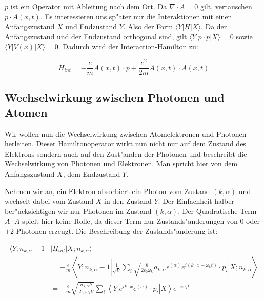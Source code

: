 $p$ ist ein Operator mit Ableitung nach dem Ort. Da $\nabla \cdot A = 0$ gilt, vertauschen $p \cdot A(x, t)$. Es interessieren uns sp"ater nur die Interaktionen mit einen Anfangszustand $X$ und Endzustand $Y$. Also der Form $\langle Y|H|X \rangle$. Da der Anfangszustand und der Endzustand orthogonal sind, gilt $\langle Y|p \cdot p|X \rangle = 0$ sowie $\langle Y|V(x)|X \rangle = 0$. Dadurch wird der Interaction-Hamilton zu:

\begin{equation*}
H_{int} = -\frac{e}{m} A(x, t) \cdot p + \frac{e^2}{2m}A(x, t) \cdot A(x, t)
\end{equation*}

\subsection{Wechselwirkung zwischen Photonen und Atomen}

Wir wollen nun die Wechselwirkung zwischen Atomelektronen und Photonen herleiten. Dieser Hamiltonoperator wirkt nun nicht nur auf dem Zustand des Elektrons sondern auch auf den Zust"anden der Photonen und beschreibt die Wechselwirkung von Photonen und Elektronen. Man spricht hier von dem Anfangszustand $X$, dem Endzustand $Y$.

Nehmen wir an, ein Elektron absorbiert ein Photon vom Zustand $(k,\alpha)$ und wechselt dabei vom Zustand $X$ in den Zustand $Y$. Der Einfachheit halber ber"ucksichtigen wir nur Photonen im Zustand $(k,\alpha)$. Der Quadratische Term $A \cdot A$ spielt hier keine Rolle, da dieser Term nur Zustands"anderungen von $0$ oder $\pm 2$ Photonen erzeugt. Die Beschreibung der Zustands"anderung ist:

\begin{equation} \label{fq:absorbtion}
\begin{split}
\langle Y; n_{k,\alpha} - 1 &| H_{int} | X; n_{k,\alpha} \rangle \\
&= -\frac{e}{m} \left\langle Y; n_{k,\alpha} - 1 \left| 
\frac{1}{\sqrt{V}} \sum_i \sqrt{\frac{\hbar}{2 \epsilon_0 \omega_k}}a_{k,\alpha} \epsilon^{(\alpha)} e^{i(k \cdot x-\omega_k t)} \cdot p_i 
\right| X; n_{k,\alpha} \right\rangle\\
&= -\frac{e}{m} \sqrt{\frac{n_{k,\alpha} \hbar}{2 \epsilon_0 \omega_k V}} \sum_i \left\langle Y \left| 
e^{ik \cdot x} \epsilon^{(\alpha)} \cdot p_i 
\right| X \right\rangle e^{-i\omega_k t}
\end{split}
\end{equation}

